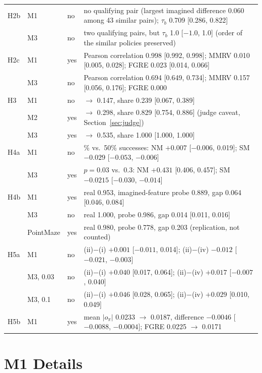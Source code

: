\documentclass[10pt]{article}
\begin{document}
\begin{table}[h]
\begin{tabular}{>{\raggedright}p{1.0cm}>{\raggedright}p{1.3cm}>{\raggedright}p{1.1cm}>{\raggedright\arraybackslash}p{10.75cm}}
H2b & M1 & no & no qualifying pair (largest imagined difference 0.060 among 43 similar pairs); $\tau_b$ 0.709 [0.286, 0.822] \\
 & M3 & no & two qualifying pairs, but $\tau_b$ 1.0 [$-1.0$, 1.0] (order of the similar policies preserved) \\
H2c & M1 & yes & Pearson correlation 0.998 [0.992, 0.998]; MMRV 0.010 [0.005, 0.028]; FGRE 0.023 [0.014, 0.066] \\
 & M3 & no & Pearson correlation 0.694 [0.649, 0.734]; MMRV 0.157 [0.056, 0.176]; FGRE 0.000 \\
H3 & M1 & no & 0.112 $\to$ 0.147, share 0.239 [0.067, 0.389] \\
 & M2 & yes & 0.051 $\to$ 0.298, share 0.829 [0.754, 0.886] (judge caveat, Section~\ref{sec:judge}) \\
 & M3 & yes & 0.000 $\to$ 0.535, share 1.000 [1.000, 1.000] \\
H4a & M1 & no & 97\% vs.\ 50\% successes: NM $+0.007$ [$-0.006$, 0.019]; SM $-0.029$ [$-0.053$, $-0.006$] \\
 & M3 & yes & $p=0.03$ vs.\ 0.3: NM $+0.431$ [0.406, 0.457]; SM $-0.0215$ [$-0.030$, $-0.014$] \\
H4b & M1 & yes & real 0.953, imagined-feature probe 0.889, gap 0.064 [0.046, 0.084] \\
 & M3 & no & real 1.000, probe 0.986, gap 0.014 [0.011, 0.016] \\
 & PointMaze & yes & real 0.980, probe 0.778, gap 0.203 (replication, not counted) \\
H5a & M1 & no & (ii)$-$(i) $+0.001$ [$-0.011$, 0.014]; (ii)$-$(iv) $-0.012$ [$-0.021$, $-0.003$] \\
 & M3, 0.03 & no & (ii)$-$(i) $+0.040$ [0.017, 0.064]; (ii)$-$(iv) $+0.017$ [$-0.007$, 0.040] \\
 & M3, 0.1 & no & (ii)$-$(i) $+0.046$ [0.028, 0.065]; (ii)$-$(iv) $+0.029$ [0.010, 0.049] \\
H5b & M1 & yes & mean $|o_\pi|$ 0.0233 $\to$ 0.0187, difference $-0.0046$ [$-0.0088$, $-0.0004$]; FGRE 0.0225 $\to$ 0.0171 \\
\bottomrule
\end{tabular}
\end{table}

\section{M1 Details}
\label{app:m1}
\end{document}
